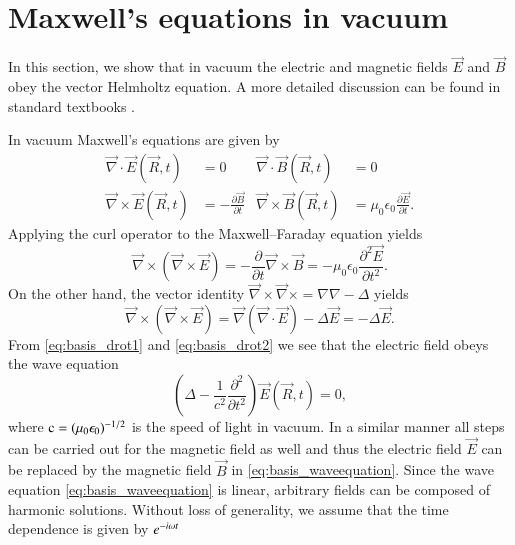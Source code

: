 \section{Maxwell's equations in vacuum}

In this section, we show that in vacuum the electric and magnetic fields $\vec
E$ and $\vec B$ obey the vector Helmholtz equation. A more detailed discussion
can be found in standard textbooks \cite{bohrenhuffman,jackson, mueller,
stratton}.

In vacuum Maxwell's equations are given by
\begin{align}
\label{eq:maxwell_hom}
\vec{\nabla}\cdot \vec{E}(\vec R, t) &= 0 & \vec{\nabla}\cdot\vec{B}(\vec R, t) &= 0 \\
\label{eq:maxwell_inhom}
\vec{\nabla}\times\vec{E}(\vec R, t) &= -\displaystyle\frac{\partial\vec B}{\partial t} & \vec{\nabla} \times \vec{B}(\vec R, t) &= \mu_0\epsilon_0 \displaystyle\frac{\partial\vec E}{\partial t}.
\end{align}
Applying the curl operator to the Maxwell--Faraday equation yields
\begin{equation}
\label{eq:basis_drot1}
\vec\nabla \times \left(\vec\nabla \times \vec E\right) =
-\frac{\partial}{\partial t} \vec\nabla \times \vec B =
-\mu_0\epsilon_0 \frac{\partial^2\vec E}{\partial t^2}.
\end{equation}
On the other hand, the vector identity $\vec\nabla\times\vec\nabla\times = \nabla\nabla - \Delta$ yields
\begin{equation}
\label{eq:basis_drot2}
\vec\nabla \times \left(\vec\nabla \times \vec E\right) =
\vec\nabla\left(\vec\nabla\cdot \vec E\right) - \Delta\vec E =
-\Delta\vec E.
\end{equation}
From \eqref{eq:basis_drot1} and \eqref{eq:basis_drot2} we see that the
electric field obeys the wave equation
\begin{equation}
\label{eq:basis_waveequation}
\left(\Delta - \frac{1}{c^2}\frac{\partial^2}{\partial t^2}\right) \vec E(\vec R,t) = 0,
\end{equation}
where $\mathrm{c}=(\mu_0\epsilon_0)^{-1/2}$ is the speed of light in vacuum.
In a similar manner all steps can be carried out for the magnetic field as well
and thus the electric field $\vec E$ can be replaced by the magnetic field
$\vec B$ in \eqref{eq:basis_waveequation}.
Since the
wave equation \eqref{eq:basis_waveequation} is linear, arbitrary fields can be
composed of harmonic solutions. Without loss of generality, we assume that
the time dependence is given by $e^{-i\omega t}$
